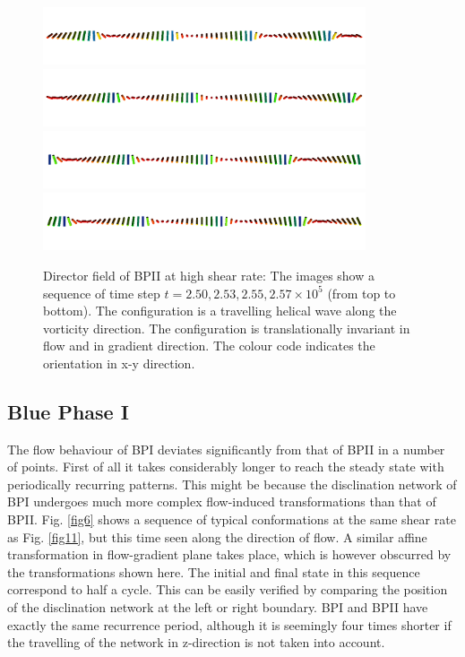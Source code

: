 \documentclass[aps,pre,onecolumn,groupedaddress]{revtex4-1}
\newcommand{\e}[1]{\times10^{#1}}
\begin{document}
\begin{figure}[h]
\includegraphics[width=0.85\textwidth]{dir+y-250k_run949.png}
\includegraphics[width=0.85\textwidth]{dir+y-253k_run949.png}
\includegraphics[width=0.85\textwidth]{dir+y-255k_run949.png}
\includegraphics[width=0.85\textwidth]{dir+y-257k_run949.png}
\caption{Director field of BPII at high shear rate: The images show a sequence of time step $t=2.50, 2.53,2.55, 2.57\e{5}$ (from top to bottom). The configuration is a travelling helical wave along the vorticity direction. The configuration is translationally invariant in flow and in gradient direction. The colour code indicates the orientation in x-y direction.}
\label{bp2-high}
\end{figure}

\clearpage

\subsection{Blue Phase I}

The flow behaviour of BPI deviates significantly from that of BPII in a number of points.
First of all it takes considerably longer to reach the steady state with periodically recurring patterns.
This might be because the disclination network of BPI undergoes much more complex flow-induced transformations than that of BPII.
Fig. \ref{fig6} shows a sequence of typical conformations at the same shear rate as Fig. \ref{fig11}, but this time seen along the direction of flow.
A similar affine transformation in flow-gradient plane takes place, which is however obscurred by the transformations shown here. 
The initial and final state in this sequence correspond to half a cycle. 
This can be easily verified by comparing the position of the disclination network at the left or right boundary.
BPI and BPII have exactly the same recurrence period, although it is seemingly four times shorter if the travelling of the network in z-direction is not taken into account.  
\end{document}

